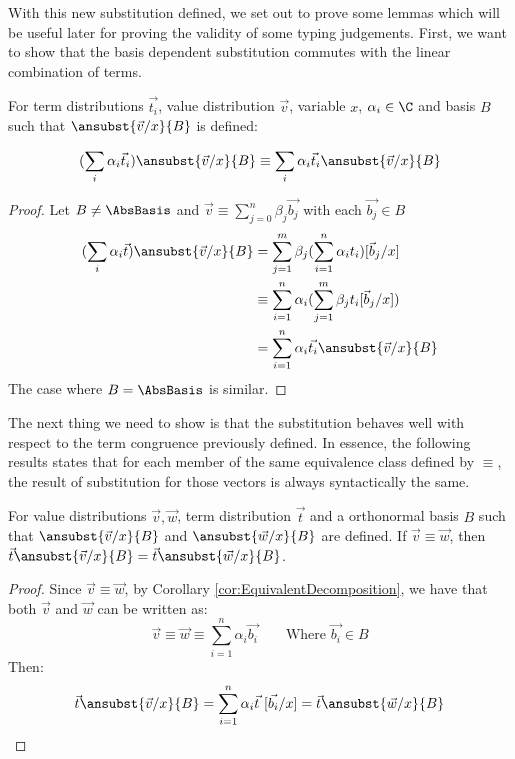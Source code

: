 With this new substitution defined, we set out to prove some lemmas which will be useful later for proving the validity of some typing judgements. First, we want to show that the basis dependent substitution commutes with the linear combination of terms.

\begin{lemma}\label{lem:distributiveSubstitution}
  For term distributions $\vec{t_i}$, value distribution $\vec{v}$, variable $x$, $\alpha_i\in\C$ and basis $B$ such that $\ansubst{\vec v/x}{B}$ is defined: 
  
  \[(\sum_i \alpha_i\vec t_i)\ansubst{\vec v/x}{B} \equiv \sum_i \alpha_i\vec t_i \ansubst{\vec v/x}{B}\] 
\end{lemma}

\begin{proof}
  Let $B\neq\AbsBasis$ and $\vec{v}\equiv\sum\limits_{j=0}^n \beta_j \vec{b_j}$ with each $\vec{b_j}\in B$
  \begin{align*}
    (\sum_i \alpha_i\vec t)\ansubst{\vec v/x}{B} &= \sum_{j=1}^m \beta_j(\sum_{i=1}^{n} \alpha_i t_i)[\vec b_j/x]\\
    &\equiv \sum_{i=1}^{n} \alpha_i (\sum_{j=1}^m \beta_j t_i [\vec b_j/x])\\
    &= \sum_{i=1}^{n} \alpha_i \vec{t_i}\ansubst{\vec v/x}{B}
  \end{align*}
  The case where $B=\AbsBasis$ is similar.
\end{proof}

The next thing we need to show is that the substitution behaves well with respect to the term congruence previously defined. In essence, the following results states that for each member of the same equivalence class defined by $\equiv$, the result of substitution for those vectors is always syntactically the same.

\begin{lemma}\label{lem:EquivSubstitutions}
  For value distributions $\vec{v},\vec{w}$, term distribution $\vec{t}$ and a orthonormal basis $B$ such that $\ansubst{\vec{v}/x}{B}$ and $\ansubst{\vec{w}/x}{B}$ are defined. If $\vec{v}\equiv\vec{w}$, then $\vec{t}\ansubst{\vec{v}/x}{B}=\vec{t}\ansubst{\vec{w}/x}{B}$.
\end{lemma}

\begin{proof}
  Since $\vec{v}\equiv\vec{w}$, by Corollary \ref{cor:EquivalentDecomposition}, we have that both $\vec{v}$ and $\vec{w}$ can be written as:
  \[
  \vec{v} \equiv \vec{w} \equiv \sum_{i=1}^{n} \alpha_i \vec{b_i}\qquad\text{Where }\vec{b_i}\in B
  \]
  Then:
  \[
  \vec{t}\ansubst{\vec{v}/x}{B} = \sum_{i=1}^{n} \alpha_i \vec{t}\ [\vec{b_i}/x] = \vec{t}\ansubst{\vec{w}/x}{B}
  \]
\end{proof}

